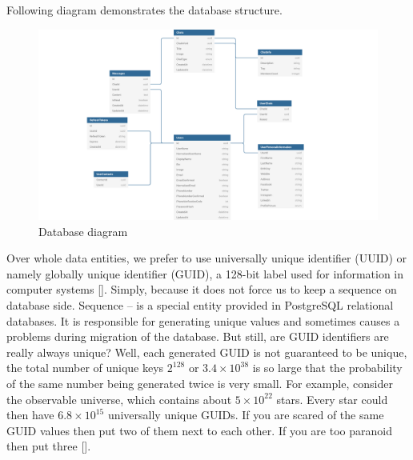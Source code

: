 Following diagram demonstrates the database structure.
\begin{figure}[H]
    \centering
    \includegraphics[width=1.2\textwidth]{Pictures/DB_diagram}
    \caption{Database diagram}\label{fig:figure5}
\end{figure}
Over whole data entities, we prefer to use universally unique identifier (UUID) or namely globally unique identifier (GUID),
a 128-bit label used for information in computer systems [\cite{leach2005universally}].
Simply, because it does not force us to keep a sequence on database side.
Sequence -- is a special entity provided in PostgreSQL relational databases.
It is responsible for generating unique values and sometimes causes a problems during migration of the database.
But still, are GUID identifiers are really always unique?
Well, each generated GUID is not guaranteed to be unique, the total number of unique keys $2^{128}$ or $3.4 \times 10^{38}$
is so large that the probability of the same number being generated twice is very small.
For example, consider the observable universe, which contains about $5 \times 10^{22}$ stars.
Every star could then have $6.8 \times 10^{15}$ universally unique GUIDs.
If you are scared of the same GUID values then put two of them next to each other.
If you are too paranoid then put three [\cite{GuidSo}].

